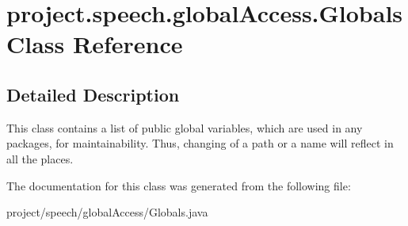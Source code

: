 \section{project.\+speech.\+global\+Access.\+Globals Class Reference}
\label{classproject_1_1speech_1_1global_access_1_1_globals}


\subsection{Detailed Description}
This class contains a list of public global variables, which are used in any packages, for maintainability. Thus, changing of a path or a name will reflect in all the places. 

The documentation for this class was generated from the following file\+:\begin{DoxyCompactItemize}
\item 
project/speech/global\+Access/Globals.\+java\end{DoxyCompactItemize}
